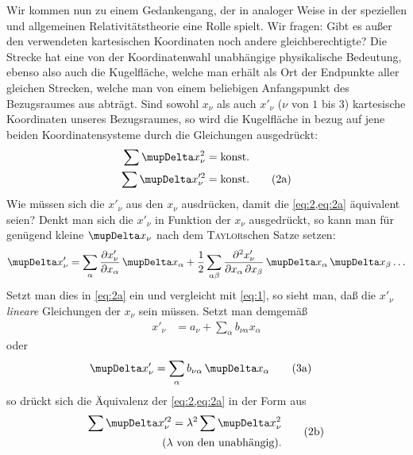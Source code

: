 Wir kommen nun zu einem Gedankengang, der in analoger Weise in der speziellen 
und allgemeinen Relativitätstheorie eine Rolle spielt. Wir fragen: Gibt es 
außer den verwendeten kartesischen Koordinaten noch andere gleichberechtigte? 
Die Strecke hat eine von der Koordinatenwahl unabhängige physikalische 
Bedeutung, ebenso also auch die Kugelfläche, welche man erhält als Ort der 
Endpunkte aller gleichen Strecken, welche man von einem beliebigen 
Anfangspunkt des Bezugsraumes aus abträgt. Sind sowohl $x_\nu$ als auch 
$x'_\nu$ ($\nu$ von $1$ bis $3$) kartesische Koordinaten unseres Bezugsraumes, 
so wird die Kugelfläche in bezug auf jene beiden Koordinatensysteme durch die 
Gleichungen ausgedrückt:
\begin{align}
	\sum \Dva x_{\nu}^{2} &= \text{konst.}
	\label{eq:2} \\
	\sum \Dva x^{\prime 2}_{\nu}&= \text{konst.}
	\label{eq:2a} \tag{2a}
\end{align}
Wie müssen sich die $x'_{\nu}$ aus den $x_{\nu}$ ausdrücken, damit die 
\cref{eq:2,eq:2a} äquivalent seien? Denkt man sich die $x'_{\nu}$ in Funktion 
der $x_{\nu}$ ausgedrückt, so kann man für genügend kleine $\Dva x_{\nu}$ 
nach dem \textsc{Taylor}schen Satze setzen: 
\begin{align*}
\Dva x'_{\nu} = 
	\sum_{\alpha} \frpa{x'_{\nu}}{x_{\alpha}}\,\Dva x_{\alpha} +
	\frac{1}{2} \sum_{\alpha\beta}
		\frpa{^2 x'_{\nu}}{x_{\alpha}\,\partial x_{\beta}}
			\,\Dva x_{\alpha}\,\Dva x_{\beta} \ldots
\end{align*}
Setzt man dies in \eqref{eq:2a} ein und vergleicht mit \eqref{eq:1}, so sieht
man, daß die $x'_{\nu}$ \emph{lineare} Gleichungen der $x_{\nu}$ sein müssen.
Setzt man demgemäß
\begin{align}
	x'_{\nu} &= a_{\nu} + \sum_\alpha b_{\nu\alpha} x_{\alpha}
	\label{eq:3}
\end{align}
oder
\begin{align}
	\Dva x'_{\nu} &= \sum_\alpha b_{\nu\alpha}\,\Dva x_{\alpha}
	\label{eq:3a} \tag{3a}
\end{align}
so drückt sich die Äquivalenz der \cref{eq:2,eq:2a} in der Form aus
\begin{align}
\begin{aligned}
	\sum \Dva x^{\prime 2}_{\nu} = \lambda^2 \sum \Dva x_{\nu}^2
	\\
	\text{($\lambda$ von den unabhängig)}.
\end{aligned}
	\label{eq:2b} \tag{2b}
\end{align}
